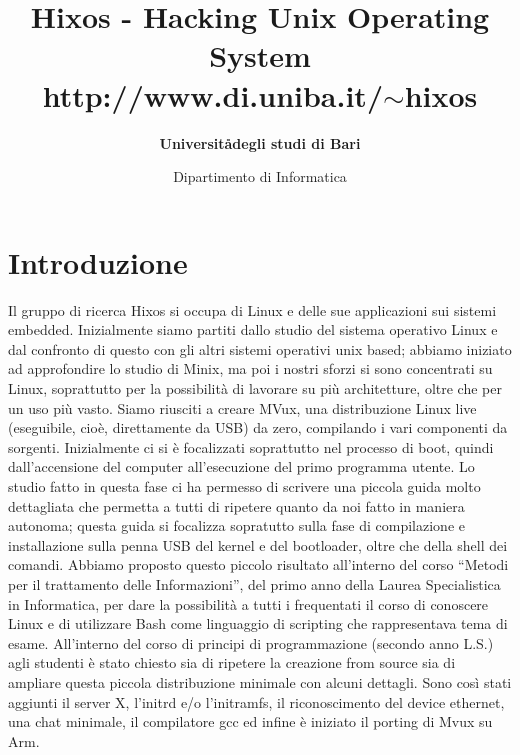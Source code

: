 \documentclass[a4paper,12pt]{article}
\title{\textbf{Hixos} - Hacking Unix Operating System\\http://www.di.uniba.it/$\sim$hixos}
\author{\textbf{Universit\aa degli studi di Bari}}
\date{Dipartimento di Informatica}
\renewcommand{\aa }{\`{a} }
\newcommand{\ea }{\`{e} }
\newcommand{\ia }{\`{i} }
\begin{document}
\maketitle

\section*{Introduzione}
Il gruppo di ricerca Hixos si occupa di Linux e delle sue applicazioni sui sistemi embedded.
Inizialmente siamo partiti dallo studio del sistema operativo Linux e dal confronto di questo con gli altri sistemi operativi unix based; abbiamo iniziato ad approfondire lo studio di Minix, ma poi i nostri sforzi si sono concentrati su Linux, soprattutto per la possibilità di lavorare su più architetture, oltre che per un uso più vasto.
Siamo riusciti a creare MVux, una distribuzione Linux live (eseguibile, cioè, direttamente da USB) da zero, compilando i vari componenti da sorgenti.
Inizialmente ci si è focalizzati soprattutto nel processo di boot, quindi dall'accensione del computer all'esecuzione del primo programma utente.
Lo studio fatto in questa fase ci ha permesso di scrivere una piccola guida molto dettagliata che permetta a tutti di ripetere quanto da noi fatto in maniera autonoma; questa guida si focalizza sopratutto sulla fase di compilazione e installazione sulla penna USB del kernel e del bootloader, oltre che della shell dei comandi.
Abbiamo proposto questo piccolo risultato all'interno del corso ``Metodi per il trattamento delle Informazioni'', del primo anno della Laurea Specialistica in Informatica, per dare la possibilit\aa a tutti i frequentati il corso di conoscere Linux e di utilizzare Bash come linguaggio di scripting che rappresentava tema di esame.
All'interno del corso di principi di programmazione (secondo anno L.S.) agli studenti \ea stato chiesto sia di ripetere la creazione from source sia di ampliare questa piccola distribuzione minimale con alcuni dettagli. Sono cos\ia stati aggiunti il server X, l'initrd e\slash o l'initramfs, il riconoscimento del device ethernet, una chat minimale, il compilatore gcc ed infine \ea iniziato il porting di Mvux su Arm.
\end{document}
